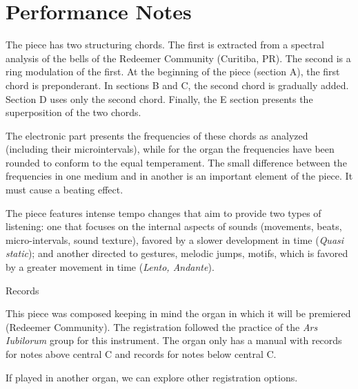 
\section{Performance Notes}

The piece has two structuring chords. The first is extracted from a spectral analysis of the bells of the Redeemer Community (Curitiba, PR). The second is a ring modulation of the first. At the beginning of the piece (section A), the first chord is preponderant. In sections B and C, the second chord is gradually added. Section D uses only the second chord. Finally, the E section presents the superposition of the two chords.

The electronic part presents the frequencies of these chords as analyzed (including their microintervals), while for the organ the frequencies have been rounded to conform to the equal temperament. The small difference between the frequencies in one medium and in another is an important element of the piece. It must cause a beating effect.

The piece features intense tempo changes that aim to provide two types of listening: one that focuses on the internal aspects of sounds (movements, beats, micro-intervals, sound texture), favored by a slower development in time (\textit{Quasi static}); and another directed to gestures, melodic jumps, motifs, which is favored by a greater movement in time (\textit{Lento, Andante}).


Records

This piece was composed keeping in mind the organ in which it will be premiered (Redeemer Community). The registration followed the practice of the \textit{Ars Iubilorum} group for this instrument. The organ only has a manual with records for notes above central C and records for notes below central C.

\vspace{10mm}

If played in another organ, we can explore other registration options.


